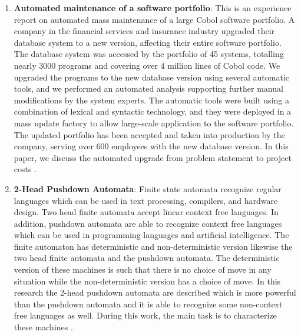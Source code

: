 \begin{englishtext}
\begin{enumerate}
    \item \textbf{Automated maintenance of a software portfolio}: This is an
    experience report on automated mass maintenance of a large Cobol software
    portfolio. A company in the financial services and insurance industry
    upgraded their database system to a new version, affecting their entire
    software portfolio. The database system was accessed by the portfolio of 45
    systems, totalling nearly 3000 programs and covering over 4 million lines of
    Cobol code. We upgraded the programs to the new database version using
    several automatic tools, and we performed an automated analysis supporting
    further manual modifications by the system experts. The automatic tools were
    built using a combination of lexical and syntactic technology, and they were
    deployed in a mass update factory to allow large-scale application to the
    software portfolio. The updated portfolio has been accepted and taken into
    production by the company, serving over 600 employees with the new database
    version. In this paper, we discuss the automated upgrade from problem
    statement to project costs \cite{softwarePortfolio}.

    \item \textbf{2-Head Pushdown Automata}: Finite state automata recognize
    regular languages which can be used in text processing, compilers, and
    hardware design. Two head finite automata accept linear context free
    languages. In addition, pushdown automata are able to recognize context free
    languages which can be used in programming languages and artificial
    intelligence. The finite automaton has deterministic and non-deterministic
    version likewise the two head finite automata and the pushdown automata. The
    deterministic version of these machines is such that there is no choice of
    move in any situation while the non-deterministic version has a choice of
    move. In this research the 2-head pushdown automata are described which is
    more powerful than the pushdown automata and it is able to recognize some
    non-context free languages as well. During this work, the main task is to
    characterize these machines \cite{pushdownAutomata}.


\end{enumerate}
\end{englishtext}
